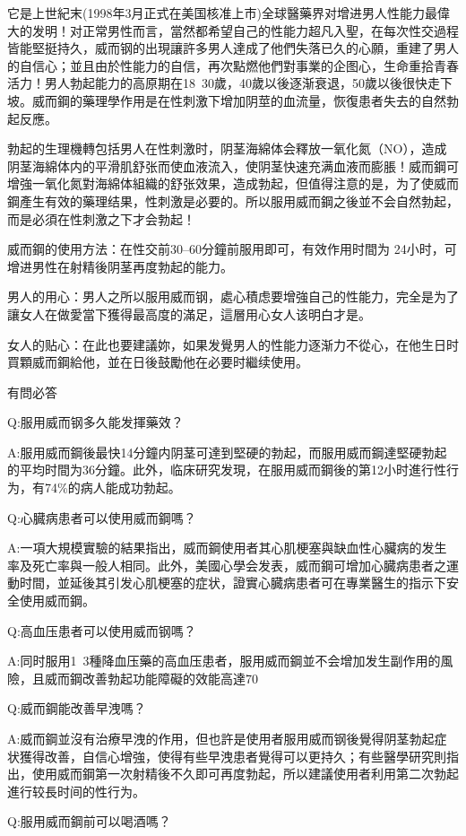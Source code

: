 \documentclass[12pt,UTF8]{ctexbook}
\begin{document}
它是上世紀末(1998年3月正式在美国核准上市)全球醫藥界对增进男人性能力最偉大的发明！对正常男性而言，當然都希望自己的性能力超凡入聖，在每次性交過程皆能堅挺持久，威而钢的出現讓許多男人達成了他們失落已久的心願，重建了男人的自信心；並且由於性能力的自信，再次點燃他們對事業的企图心，生命重拾青春活力！男人勃起能力的高原期在18~30歲，40歲以後逐渐衰退，50歲以後很快走下坡。威而鋼的藥理學作用是在性刺激下增加阴莖的血流量，恢復患者失去的自然勃起反應。

勃起的生理機轉包括男人在性刺激时，阴茎海綿体会釋放一氧化氮（NO），造成阴茎海綿体内的平滑肌舒张而使血液流入，使阴茎快速充满血液而膨脹！威而鋼可增強一氧化氮對海綿体組織的舒张效果，造成勃起，但值得注意的是，为了使威而鋼產生有效的藥理结果，性刺激是必要的。所以服用威而鋼之後並不会自然勃起，而是必須在性刺激之下才会勃起！

威而鋼的使用方法：在性交前30--60分鐘前服用即可，有效作用时間为
24小时，可增进男性在射精後阴茎再度勃起的能力。

男人的用心：男人之所以服用威而钢，處心積虑要增強自己的性能力，完全是为了讓女人在做愛當下獲得最高度的滿足，這層用心女人该明白才是。

女人的贴心：在此也要建議妳，如果发覺男人的性能力逐渐力不從心，在他生日时買顆威而鋼給他，並在日後鼓勵他在必要时繼续使用。

有問必答

Q:服用威而钢多久能发揮藥效？

A:服用威而鋼後最快14分鐘内阴茎可達到堅硬的勃起，而服用威而鋼達堅硬勃起的平均时間为36分鐘。此外，临床研究发現，在服用威而鋼後的第12小时進行性行为，有74\%的病人能成功勃起。

Q:心臓病患者可以使用威而鋼嗎？

A:一項大規模實驗的結果指出，威而鋼使用者其心肌梗塞與缺血性心臟病的发生率及死亡率與一般人相同。此外，美國心學会发表，威而鋼可增加心臓病患者之運動时間，並延後其引发心肌梗塞的症状，證實心臓病患者可在專業醫生的指示下安全使用威而鋼。

Q:高血压患者可以使用威而钢嗎？

A:同时服用1~3種降血压藥的高血压患者，服用威而鋼並不会增加发生副作用的風險，且威而鋼改善勃起功能障礙的效能高達70%

Q:威而鋼能改善早洩嗎？

A:威而鋼並沒有治療早洩的作用，但也許是使用者服用威而钢後覺得阴茎勃起症状獲得改善，自信心增強，使得有些早洩患者覺得可以更持久；有些醫學研究則指出，使用威而鋼第一次射精後不久即可再度勃起，所以建議使用者利用第二次勃起進行较長时间的性行为。

Q:服用威而鋼前可以喝酒嗎？
\end{document}
